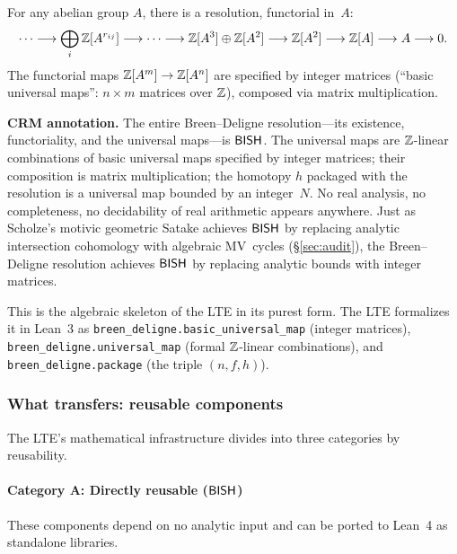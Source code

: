 \begin{theorem}
For any abelian group $A$, there is a resolution, functorial in~$A$:
\[
  \cdots \longrightarrow \bigoplus_{i} \mathbb{Z}[A^{r_{ij}}]
  \longrightarrow \cdots
  \longrightarrow \mathbb{Z}[A^3] \oplus \mathbb{Z}[A^2]
  \longrightarrow \mathbb{Z}[A^2]
  \longrightarrow \mathbb{Z}[A]
  \longrightarrow A \longrightarrow 0.
\]
The functorial maps $\mathbb{Z}[A^m] \to \mathbb{Z}[A^n]$ are specified by
integer matrices (``basic universal maps'': $n \times m$ matrices
over $\mathbb{Z}$), composed via matrix multiplication.
\end{theorem}

\noindent\textbf{CRM annotation.}
The entire Breen--Deligne resolution---its existence, functoriality,
and the universal maps---is $\textsf{BISH}$.  The universal maps are
$\mathbb{Z}$-linear combinations of basic universal maps specified by
integer matrices; their composition is matrix multiplication; the
homotopy $h$ packaged with the resolution is a universal map bounded
by an integer~$N$.  No real analysis, no completeness, no decidability
of real arithmetic appears anywhere.  Just as Scholze's motivic
geometric Satake achieves $\textsf{BISH}$ by replacing analytic intersection
cohomology with algebraic MV~cycles (\S\ref{sec:audit}), the
Breen--Deligne resolution achieves $\textsf{BISH}$ by replacing analytic
bounds with integer matrices.

This is the algebraic skeleton of the LTE in its purest form.
The LTE formalizes it in Lean~3 as
\texttt{breen\_deligne.basic\_universal\_map} (integer matrices),
\texttt{breen\_deligne.universal\_map} (formal $\mathbb{Z}$-linear
combinations), and \texttt{breen\_deligne.package} (the triple
$(n, f, h)$).

\subsubsection{What transfers: reusable components}\label{sec:reusable}

The LTE's mathematical infrastructure divides into three categories
by reusability.

\paragraph{Category A: Directly reusable ($\textsf{BISH}$)}

These components depend on no analytic input and can be ported to
Lean~4 as standalone libraries.

